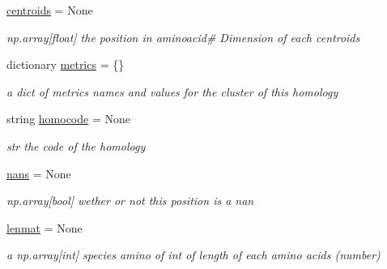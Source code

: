 \begin{DoxyCompactItemize}
\mbox{\hyperlink{class_py_c_u_b_1_1homology_1_1homology_a7553f27ba7af2b61b973688bf1c72a7b}{centroids}} = None
\begin{DoxyCompactList}\small\item\em np.\+array\mbox{[}float\mbox{]} the position in aminoacid\# Dimension of each centroids \end{DoxyCompactList}\item 
\mbox{\label{class_py_c_u_b_1_1homology_1_1homology_ad0fa49f698ad9e7ae29f624d45462c4d}} 
dictionary \mbox{\hyperlink{class_py_c_u_b_1_1homology_1_1homology_ad0fa49f698ad9e7ae29f624d45462c4d}{metrics}} = \{\}
\begin{DoxyCompactList}\small\item\em a dict of metrics names and values for the cluster of this homology \end{DoxyCompactList}\item 
\mbox{\label{class_py_c_u_b_1_1homology_1_1homology_a1eb731bc0f1f864f9bdc1b00e2038dc6}} 
string \mbox{\hyperlink{class_py_c_u_b_1_1homology_1_1homology_a1eb731bc0f1f864f9bdc1b00e2038dc6}{homocode}} = \textquotesingle{}None\textquotesingle{}
\begin{DoxyCompactList}\small\item\em str the code of the homology \end{DoxyCompactList}\item 
\mbox{\label{class_py_c_u_b_1_1homology_1_1homology_acbb6a5d373b79e9a783eb9efaaaecb97}} 
\mbox{\hyperlink{class_py_c_u_b_1_1homology_1_1homology_acbb6a5d373b79e9a783eb9efaaaecb97}{nans}} = None
\begin{DoxyCompactList}\small\item\em np.\+array\mbox{[}bool\mbox{]} wether or not this position is a nan \end{DoxyCompactList}\item 
\mbox{\label{class_py_c_u_b_1_1homology_1_1homology_a56a1f0e4e56e373d69c3d39712937278}} 
\mbox{\hyperlink{class_py_c_u_b_1_1homology_1_1homology_a56a1f0e4e56e373d69c3d39712937278}{lenmat}} = None
\begin{DoxyCompactList}\small\item\em a np.\+array\mbox{[}int\mbox{]} species amino of int of length of each amino acids (number) \end{DoxyCompactList}\item 

\end{DoxyCompactItemize}
